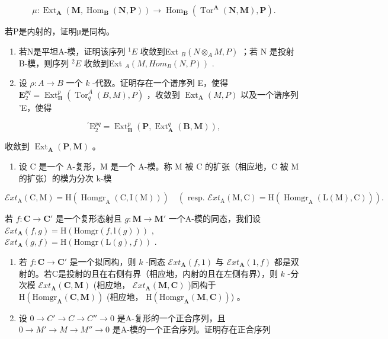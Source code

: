 \[
\mu : \operatorname{Ext} _ {\mathbf {A}} (\mathbf {M}, \operatorname{Hom} _ {\mathbf {B}} (\mathbf {N}, \mathbf {P})) \rightarrow \operatorname{Hom} _ {\mathbf {B}} \left(\operatorname{Tor} ^ {\mathbf {A}} (\mathbf {N}, \mathbf {M}), \mathbf {P}\right).
\]

若P是内射的，证明μ是同构。

\begin{enumerate}
\def\labelenumi{\alph{enumi})}
\setcounter{enumi}{2}
\item
  若N是平坦A-模，证明该序列 \({}^{1}E\) 收敛到Ext \(_{B}(N \otimes_{A} M, P)\) ；若 N 是投射 B-模，则序列 \({}^{2}E\) 收敛到Ext \(_{A}(M, Hom_{B}(N, P))\) .
\item
  设 \(\rho: A \to B\) 一个 \(k\) -代数。证明存在一个谱序列 E，使得 \(\mathbf{E}_2^{pq} = \operatorname{Ext}_{\mathbf{B}}^p (\operatorname{Tor}_q^A(B, M), P)\) ，收敛到 \(\operatorname{Ext}_{\mathbf{A}}(M, P)\) 以及一个谱序列 'E，使得
\end{enumerate}

\[
{ } ^ { \prime } \mathrm{E} _ { 2 } ^ { p q } = \operatorname{Ext} _ { \mathbf { B } } ^ { p } ( \mathbf { P } , \operatorname{Ext} _ { \mathbf { A } } ^ { q } ( \mathbf { B } , \mathbf { M } ) ) ,
\]

收敛到 \(\operatorname{Ext}_{\mathbf{A}}(\mathbf{P}, \mathbf{M})\) 。

\begin{enumerate}
\def\labelenumi{\arabic{enumi})}
\setcounter{enumi}{6}
\tightlist
\item
  设 C 是一个 A-复形，M 是一个 A-模。称 M 被 C 的扩张（相应地，C 被 M 的扩张）的模为分次 k-模
\end{enumerate}

\[
\mathcal {E} x t _ {\mathrm{A}} (\mathrm{C}, \mathrm{M}) = \mathrm{H} (\operatorname{Homgr} _ {\mathrm{A}} (\mathrm{C}, \mathrm{I} (\mathrm{M}))) \quad \left(\text { resp. } \mathcal {E} x t _ {\mathrm{A}} (\mathrm{M}, \mathrm{C}) = \mathrm{H} (\operatorname{Homgr} _ {\mathrm{A}} (\mathrm{L} (\mathrm{M}), \mathrm{C}))\right).
\]

若 \(f: \mathbf{C} \to \mathbf{C}'\) 是一个复形态射且 \(g: \mathbf{M} \to \mathbf{M}'\) 一个A-模的同态，我们设 \(\mathcal{E}xt_{\mathbf{A}}(f, g) = \mathrm{H}(\mathrm{Homgr}(f, \mathrm{l}(g)))\) , \(\mathcal{E}xt_{\mathbf{A}}(g, f) = \mathrm{H}(\mathrm{Homgr}(\mathrm{L}(g), f))\) .

\begin{enumerate}
\def\labelenumi{\alph{enumi})}
\item
  若 \(f: \mathbf{C} \to \mathbf{C}'\) 是一个拟同构，则 \(k\) -同态 \(\mathcal{E}xt_{\mathbf{A}}(f, 1)\) 与 \(\mathcal{E}xt_{\mathbf{A}}(1, f)\) 都是双射的。若C是投射的且在右侧有界（相应地，内射的且在左侧有界），则 \(k\) -分次模 \(\mathcal{E}xt_{\mathbf{A}}(\mathbf{C}, \mathbf{M})\) (相应地， \(\mathcal{E}xt_{\mathbf{A}}(\mathbf{M}, \mathbf{C})\) )同构于 \(\mathrm{H}(\mathrm{Homgr}_{\mathbf{A}}(\mathbf{C}, \mathbf{M}))\) (相应地， \(\mathrm{H}(\mathrm{Homgr}_{\mathbf{A}}(\mathbf{M}, \mathbf{C}))\)) 。
\item
  设 \(0 \to C' \to C \to C'' \to 0\) 是A-复形的一个正合序列，且 \(0 \to M' \to M \to M'' \to 0\) 是A-模的一个正合序列。证明存在正合序列
\end{enumerate}

